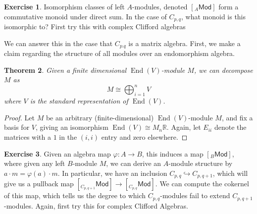 \documentclass[psamsfonts]{amsart}
\newtheorem{thm}{Theorem}[section]
\theoremstyle{definition}
\newtheorem{exer}[thm]{Exercise}
\theoremstyle{remark}
\newcommand{\R}{\mathbb{R}}
\DeclareMathOperator{\End}{End}
\begin{document}
%
\begin{exer}
Isomorphism classes of left $A$-modules, denoted $[ _A \mathsf{Mod} ]$ form a commutative monoid under direct sum. In the case of $C_{p,q}$, what monoid is this isomorphic to? First try this with complex Clifford algebras
\end{exer}
We can answer this in the case that $C_{p.q}$ is a matrix algebra. First, we make a claim regarding the structure of all modules over an endomorphism algebra.
%
\begin{thm}
Given a finite dimensional $\End(V)$-module $M$, we can decompose $M$ as 
$$M \cong \bigoplus_{i=1}^n V $$
where $V$ is the standard representation of $\End(V)$.
\end{thm}
%
\begin{proof}
Let $M$ be an arbitrary (finite-dimensional) $\End(V)$-module $M$, and fix a basis for $V$, giving an isomorphism $\End(V) \cong M_n\R$. Again, let $E_{ii}$ denote the matrices with a $1$ in the $(i,i)$ entry and zero elsewhere.
\end{proof}
%
\begin{exer}
Given an algebra map $\varphi: A \to B$, this induces a map $[ _B \mathsf{Mod}]$, where given any left $B$-module $M$, we can derive an $A$-module structure by $a \cdot m = \varphi(a) \cdot m$. In particular, we have an inclusion $C_{p,q} \hookrightarrow C_{p,q+1}$, which will give us a pullback map $[ _{C_{p,q+1}}\mathsf{Mod} ] \to [ _{C_{p,q}}\mathsf{Mod}]$. We can compute the cokernel of this map, which tells us the degree to which $C_{p,q}$-modules fail to extend $C_{p,q+1}$-modules. Again, first try this for complex Clifford Algebras.
\end{exer}
%
\setcounter{thm}{0}
%
\setcounter{section}{9}
%
\end{document}
